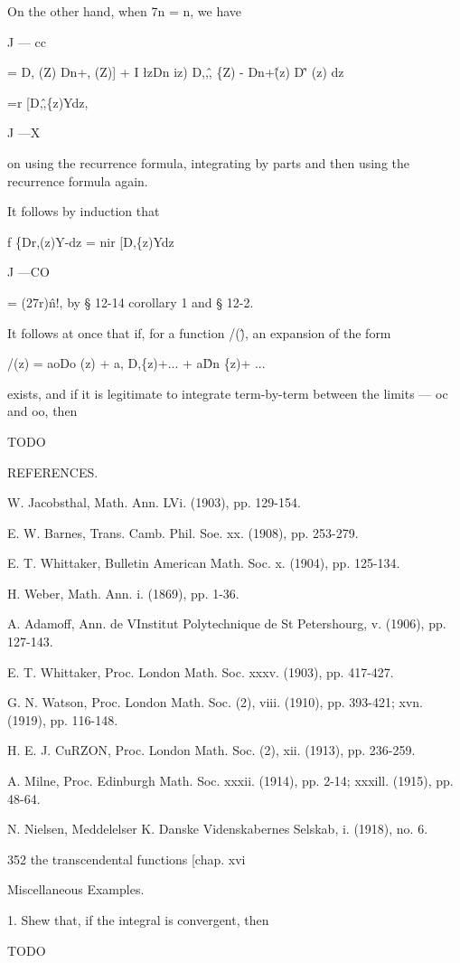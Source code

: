 On the other hand, when 7n = n, we have

J — cc

= D, (Z) Dn+, (Z)] + I \l zDn iz) D,,\^, \{Z) - Dn+\^ (z) D\^' (z) dz

=r [D,\^,\{z)Ydz,

J —X

on using the recurrence formula, integrating by parts and then using
the recurrence formula again.

It follows by induction that

f \{Dr,(z)Y-dz = nir [D,\{z)Ydz

J —CO

= (27r)\^n!, by § 12-14 corollary 1 and § 12-2.

It follows at once that if, for a function /(\^), an expansion of the
form

/(z) = aoDo (z) + a, D,\{z)+... + a\^Dn \{z)+ ...

exists, and if it is legitimate to integrate term-by-term between the
limits — oc and oo, then

TODO

REFERENCES.

W. Jacobsthal, Math. Ann. LVi. (1903), pp. 129-154.

E. W. Barnes, Trans. Camb. Phil. Soe. xx. (1908), pp. 253-279.

E. T. Whittaker, Bulletin American Math. Soc. x. (1904), pp. 125-134.

H. Weber, Math. Ann. i. (1869), pp. 1-36.

A. Adamoff, Ann. de VInstitut Polytechnique de St Petershourg, v.
(1906), pp. 127-143.

E. T. Whittaker, Proc. London Math. Soc. xxxv. (1903), pp. 417-427.

G. N. Watson, Proc. London Math. Soc. (2), viii. (1910), pp. 393-421;
xvn. (1919), pp. 116-148.

H. E. J. CuRZON, Proc. London Math. Soc. (2), xii. (1913), pp.
236-259.

A. Milne, Proc. Edinburgh Math. Soc. xxxii. (1914), pp. 2-14; xxxill.
(1915), pp. 48-64.

N. Nielsen, Meddelelser K. Danske Videnskabernes Selskab, i. (1918),
no. 6.

352 the transcendental functions [chap. xvi

Miscellaneous Examples.

1. Shew that, if the integral is convergent, then

TODO

